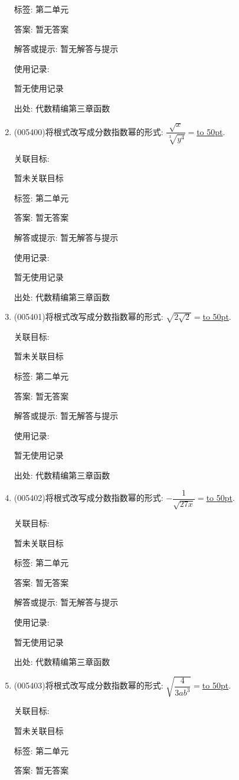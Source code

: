 \documentclass[10pt,a4paper]{article}
\newcommand{\blank}[1]{\underline{\hbox to #1pt{}}}
\begin{document}
\begin{enumerate}[1.]
标签: 第二单元

答案: 暂无答案

解答或提示: 暂无解答与提示

使用记录:

暂无使用记录


出处: 代数精编第三章函数
\item { (005400)}将根式改写成分数指数幂的形式: $\dfrac{\sqrt x}{\sqrt [3]{y^4}}=$\blank{50}.


关联目标:

暂未关联目标



标签: 第二单元

答案: 暂无答案

解答或提示: 暂无解答与提示

使用记录:

暂无使用记录


出处: 代数精编第三章函数
\item { (005401)}将根式改写成分数指数幂的形式: $\sqrt {2\sqrt 2}=$\blank{50}.


关联目标:

暂未关联目标



标签: 第二单元

答案: 暂无答案

解答或提示: 暂无解答与提示

使用记录:

暂无使用记录


出处: 代数精编第三章函数
\item { (005402)}将根式改写成分数指数幂的形式: $-\dfrac 1{\sqrt {27x}}=$\blank{50}.


关联目标:

暂未关联目标



标签: 第二单元

答案: 暂无答案

解答或提示: 暂无解答与提示

使用记录:

暂无使用记录


出处: 代数精编第三章函数
\item { (005403)}将根式改写成分数指数幂的形式: $\sqrt {\dfrac 4{3ab^3}}=$\blank{50}.


关联目标:

暂未关联目标



标签: 第二单元

答案: 暂无答案


\end{enumerate}
\end{document}
